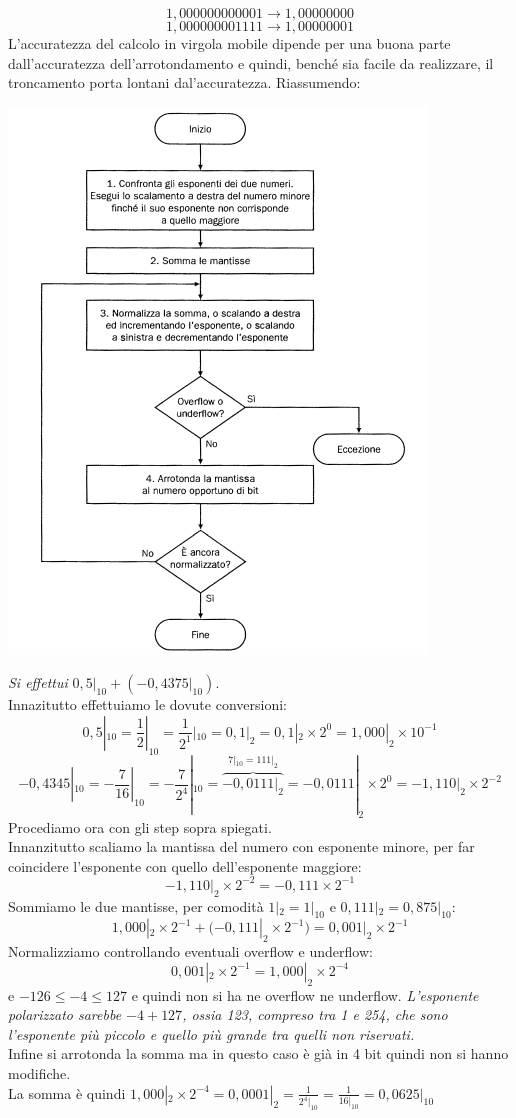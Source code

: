 \documentclass[a4paper,12pt, oneside]{book}
\begin{document}
\[1,000000000001\longrightarrow 1,00000000 \]
\[1,000000001111\longrightarrow 1,00000001\]
L'accuratezza del calcolo in virgola mobile dipende per una buona parte dall'accuratezza dell'arrotondamento e quindi, benché sia facile da realizzare, il troncamento porta lontani dal'accuratezza. Riassumendo:
\begin{center}
  \includegraphics[scale = 0.60]{img/sum.png}
\end{center}
\begin{esempio}
  \textit{Si effettui} $0,5|_{10}+ (-0,4375|_{10})$.\\
  Innazitutto effettuiamo le dovute conversioni:
  \[0,5|_{10}= \frac{1}{2}|_{10}= \frac{1}{2^1}|_{10}= 0,1|_2 = 0,1|_2 \times 2^0 = 1,000|_2 \times 10^{-1}\]
  \[-0,4345|_{10}=-\frac{7}{16}|_{10}=-\frac{7}{2^4}|_{10}=\overbrace{-0,0111|_2}^{7|_{10} = 111|_2}=-0,0111|_2 \times 2^0 = -1,110|_2 \times 2^{-2}\]
  Procediamo ora con gli step sopra spiegati.\\
  Innanzitutto scaliamo la mantissa del numero con esponente minore, per far coincidere l'esponente con quello dell'esponente maggiore:
  \[-1,110|_2\times 2^{-2} = -0,111 \times 2^{-1}\]
  Sommiamo le due mantisse, per comodità $1|_2=1|_{10}$ e $0,111|_2 = 0,875|_{10}$:
  \[1,000|_2\times 2^{-1}+ (-0,111|_2 \times 2^{-1}) = 0,001|_2\times 2^{-1}\]
  Normalizziamo controllando eventuali overflow e underflow:
  \[0,001|_2\times 2^{-1} = 1,000|_2 \times 2^{-4}\]
  e $-126 \leq -4 \leq 127$ e quindi non si ha ne overflow ne underflow. \textit{L'esponente polarizzato sarebbe $-4+ 127$, ossia 123, compreso tra 1 e 254, che
    sono l'esponente più piccolo e quello più grande tra quelli non riservati.}\\
  Infine si arrotonda la somma ma in questo caso è già in 4 bit quindi non si hanno modifiche.\\
  La somma è quindi $1,000|_2 \times 2^{-4}=0,0001|_2 = \frac{1}{2^4|_{10}} = \frac{1}{16|_{10}}= 0,0625|_{10}$
\end{esempio}
\end{document}
